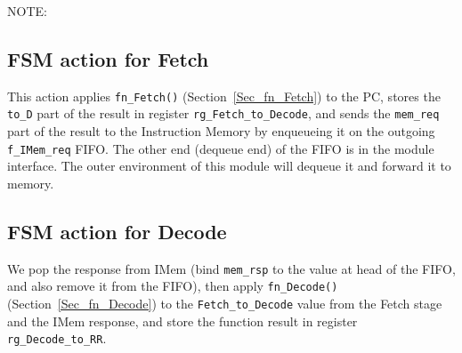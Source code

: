 
NOTE: 


\subsection{FSM action for Fetch}


This action applies \verb|fn_Fetch()| (Section~\ref{Sec_fn_Fetch}) to
the PC, stores the \verb|to_D| part of the result in register
\verb|rg_Fetch_to_Decode|, and sends the \verb|mem_req| part of the
result to the Instruction Memory by enqueueing it on the outgoing
\verb|f_IMem_req| FIFO.  The other end (dequeue end) of the FIFO is in
the module interface.  The outer environment of this module will
dequeue it and forward it to memory.


\subsection{FSM action for Decode}


We pop the response from IMem (bind \verb|mem_rsp| to the value at
head of the FIFO, and also remove it from the FIFO), then apply
\verb|fn_Decode()| (Section~\ref{Sec_fn_Decode}) to the
\verb|Fetch_to_Decode| value from the Fetch stage and the IMem
response, and store the function result in register
\verb|rg_Decode_to_RR|.


